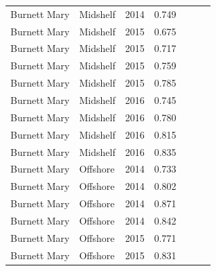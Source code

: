 \begin{longtable}{llccccc}
  Burnett Mary & Midshelf & 2014 & 0.749 & \cellcolor[HTML]{B0D235}{B} & \cellcolor[HTML]{B0D235}{B} & \cellcolor[HTML]{B0D235}{B} \\ 
  Burnett Mary & Midshelf & 2015 & 0.675 & \cellcolor[HTML]{B0D235}{B} & \cellcolor[HTML]{B0D235}{B} & \cellcolor[HTML]{B0D235}{B} \\ 
  Burnett Mary & Midshelf & 2015 & 0.717 & \cellcolor[HTML]{B0D235}{B} & \cellcolor[HTML]{B0D235}{B} & \cellcolor[HTML]{B0D235}{B} \\ 
  Burnett Mary & Midshelf & 2015 & 0.759 & \cellcolor[HTML]{B0D235}{B} & \cellcolor[HTML]{B0D235}{B} & \cellcolor[HTML]{B0D235}{B} \\ 
  Burnett Mary & Midshelf & 2015 & 0.785 & \cellcolor[HTML]{B0D235}{B} & \cellcolor[HTML]{B0D235}{B} & \cellcolor[HTML]{B0D235}{B} \\ 
  Burnett Mary & Midshelf & 2016 & 0.745 & \cellcolor[HTML]{B0D235}{B} & \cellcolor[HTML]{B0D235}{B} & \cellcolor[HTML]{B0D235}{B} \\ 
  Burnett Mary & Midshelf & 2016 & 0.780 & \cellcolor[HTML]{B0D235}{B} & \cellcolor[HTML]{B0D235}{B} & \cellcolor[HTML]{B0D235}{B} \\ 
  Burnett Mary & Midshelf & 2016 & 0.815 & \cellcolor[HTML]{B0D235}{B} & \cellcolor[HTML]{00734D}{A} & \cellcolor[HTML]{B0D235}{B} \\ 
  Burnett Mary & Midshelf & 2016 & 0.835 & \cellcolor[HTML]{00734D}{A} & \cellcolor[HTML]{00734D}{A} & \cellcolor[HTML]{B0D235}{B} \\ 
  Burnett Mary & Offshore & 2014 & 0.733 & \cellcolor[HTML]{B0D235}{B} & \cellcolor[HTML]{B0D235}{B} & \cellcolor[HTML]{B0D235}{B} \\ 
  Burnett Mary & Offshore & 2014 & 0.802 & \cellcolor[HTML]{B0D235}{B} & \cellcolor[HTML]{00734D}{A} & \cellcolor[HTML]{B0D235}{B} \\ 
  Burnett Mary & Offshore & 2014 & 0.871 & \cellcolor[HTML]{00734D}{A} & \cellcolor[HTML]{00734D}{A} & \cellcolor[HTML]{00734D}{A} \\ 
  Burnett Mary & Offshore & 2014 & 0.842 & \cellcolor[HTML]{00734D}{A} & \cellcolor[HTML]{00734D}{A} & \cellcolor[HTML]{B0D235}{B} \\ 
  Burnett Mary & Offshore & 2015 & 0.771 & \cellcolor[HTML]{B0D235}{B} & \cellcolor[HTML]{B0D235}{B} & \cellcolor[HTML]{B0D235}{B} \\ 
  Burnett Mary & Offshore & 2015 & 0.831 & \cellcolor[HTML]{B0D235}{B} & \cellcolor[HTML]{00734D}{A} & \cellcolor[HTML]{B0D235}{B} \\ 

\end{longtable}
